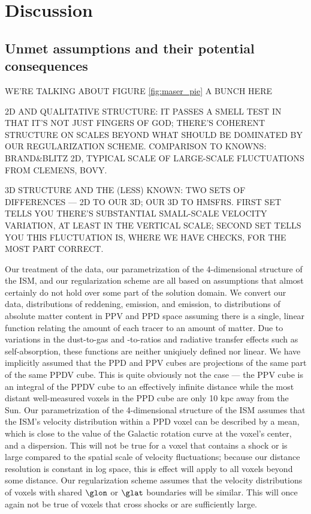 \section{Discussion}
\label{sec:discussion}

\subsection{Unmet assumptions and their potential consequences}
WE'RE TALKING ABOUT FIGURE \ref{fig:maser_pie} A BUNCH HERE

2D AND QUALITATIVE STRUCTURE: IT PASSES A SMELL TEST IN THAT IT'S NOT JUST FINGERS OF GOD; THERE'S COHERENT STRUCTURE ON SCALES BEYOND WHAT SHOULD BE DOMINATED BY OUR REGULARIZATION SCHEME. COMPARISON TO KNOWNS: BRAND&BLITZ 2D, TYPICAL SCALE OF LARGE-SCALE FLUCTUATIONS FROM CLEMENS, BOVY.

3D STRUCTURE AND THE (LESS) KNOWN: TWO SETS OF DIFFERENCES --- 2D TO OUR 3D; OUR 3D TO HMSFRS. FIRST SET TELLS YOU THERE'S SUBSTANTIAL SMALL-SCALE VELOCITY VARIATION, AT LEAST IN THE VERTICAL SCALE; SECOND SET TELLS YOU THIS FLUCTUATION IS, WHERE WE HAVE CHECKS, FOR THE MOST PART CORRECT. 

\label{sec:discussion-systematics}
Our treatment of the data, our parametrization of the 4-dimensional structure of the ISM, and our regularization scheme are all based on assumptions that almost certainly do not hold over some part of the solution domain. 
We convert our data, distributions of reddening, \atomH{} emission, and \CO emission, to distributions of absolute matter content in PPV and PPD space assuming there is a single, linear function relating the amount of each tracer to an amount of matter.
Due to variations in the dust-to-gas and \CO-to-\molH ratios and radiative transfer effects such as self-absorption, these functions are neither uniqiuely defined nor linear. 
We have implicitly assumed that the PPD and PPV cubes are projections of the same part of the same PPDV cube. 
This is quite obviously not the case --- the PPV cube is an integral of the PPDV cube to an effectively infinite distance while the most distant well-measured voxels in the PPD cube are only 10 kpc away from the Sun.
Our parametrization of the 4-dimensional structure of the ISM assumes that the ISM's velocity distribution within a PPD voxel can be described by a mean, which is close to the value of the Galactic rotation curve at the voxel's center, and a dispersion.  
This will not be true for a voxel that contains a shock or is large compared to the spatial scale of velocity fluctuations; because our distance resolution is constant in log space, this is effect will apply to all voxels beyond some distance. 
Our regularization scheme assumes that the velocity distributions of voxels with shared $\glon$ or $\glat$ boundaries will be similar. 
This will once again not be true of voxels that cross shocks or are sufficiently large. 

